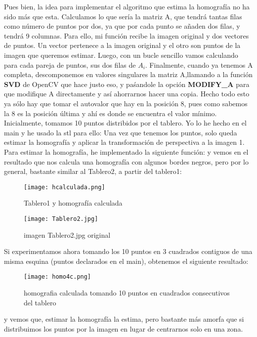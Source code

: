 Pues bien, la idea para implementar el algoritmo que estima la homografía no ha sido más que esta. Calculamos
lo que sería la matriz A, que tendrá tantas filas como número de puntos por dos, ya que por cada punto se añaden dos filas,
y tendrá 9 columnas. \newline
Para ello, mi función recibe la imagen original y dos vectores de puntos. Un vector pertenece a la imagen original y el otro son puntos
de la imagen que queremos estimar. \newline
 Luego, con un bucle sencillo vamos calculando para cada pareja de puntos, sus dos filas de $A_{i}$. Finalmente, cuando
ya tenemos A completa, descomponemos en valores singulares la matriz A,llamando a la función \textbf{SVD} de OpenCV que hace justo eso,
y paśandole la opción \textbf{MODIFY\_A} para que modifique A directamente y así ahorrarnos hacer una copia. \newline
Hecho todo esto ya sólo hay que tomar el autovalor que hay en la posición 8, pues como sabemos
la 8 es la posición última y ahí es donde se encuentra el valor mínimo. \newline
Inicialmente, tomamos 10 puntos distribidos por el tablero. Yo lo he hecho en el main y he usado la stl para ello:
Una vez que tenemos los puntos, solo queda estimar la homografía y aplicar la transformación de perspectiva a la imagen 1.
Para estimar la homografía, he implementado la siguiente función:
y vemos en el resultado que nos calcula una homografía con algunos bordes negros, pero por lo general, bastante similar al Tablero2, a partir
del tablero1:
\begin{figure}[H] %
\centering
\texttt{[image: hcalculada.png]}  %
\label{figura1}
\caption{Tablero1 y homografía calculada  }
\end{figure}

\begin{figure}[H] %
\centering
\texttt{[image: Tablero2.jpg]}  %
\label{figura1}
\caption{imagen Tablero2.jpg original}
\end{figure}

Si experimentamos ahora tomando los 10 puntos en 3 cuadrados contiguos de una misma esquina (puntos declarados en el main), obtenemos
el siguiente resultado:
\begin{figure}[H] %
\centering
\texttt{[image: homo4c.png]}  %
\label{figura1}
\caption{homografia calculada tomando 10 puntos en cuadrados consecutivos del tablero }
\end{figure}
y vemos que, estimar la homografía la estima, pero bastante más amorfa que si distribuimos los puntos por la imagen en lugar
de centrarnos solo en una zona.

